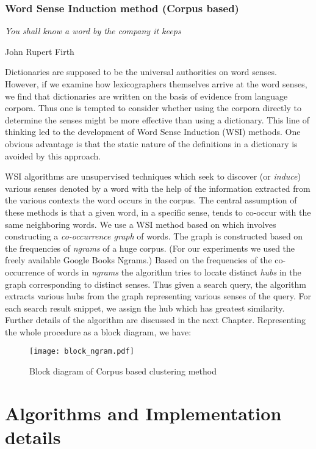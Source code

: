 \documentclass[a4paper,12pt]{report}
\begin{document}
\subsection{Word Sense Induction method (Corpus based)}

\epigraph{{\it You shall know a word by the company it keeps}}{John Rupert Firth}

Dictionaries are supposed to be the universal authorities on word
senses. However, if we examine how lexicographers themselves arrive at
the word senses, we find that dictionaries are written on the basis of
evidence from language corpora. Thus one is tempted to consider
whether using the corpora directly to determine the senses might be
more effective than using a dictionary. This line of thinking led to
the development of Word Sense Induction (WSI) methods. One obvious
advantage is that the static nature of the definitions in a dictionary
is avoided by this approach.

WSI algorithms are unsupervised techniques which seek to discover (or
{\it induce}) various senses denoted by a word with the help of the
information extracted from the various contexts the word occurs in the
corpus. The central assumption of these methods is that a given word,
in a specific sense, tends to co-occur with the same neighboring
words. We use a WSI method based on \cite{navigli} which involves
constructing a {\it co-occurrence graph} of words. The graph is
constructed based on the frequencies of {\it ngrams} of a huge
corpus. (For our experiments we used the freely available Google Books
Ngrams.) Based on the frequencies of the co-occurrence of words in
{\it ngrams} the algorithm tries to locate distinct {\it hubs} in the
graph corresponding to distinct senses. Thus given a search query, the
algorithm extracts various hubs from the graph representing various
senses of the query. For each search result snippet, we assign the hub
which has greatest similarity. Further details of the algorithm are
discussed in the next Chapter. Representing the whole procedure as a
block diagram, we have:
\begin{figure}[h]
  \centering
  \texttt{[image: block\_ngram.pdf]}
  \caption{Block diagram of Corpus based clustering method}
\end{figure}

\chapter{Algorithms and Implementation details}
\end{document}
